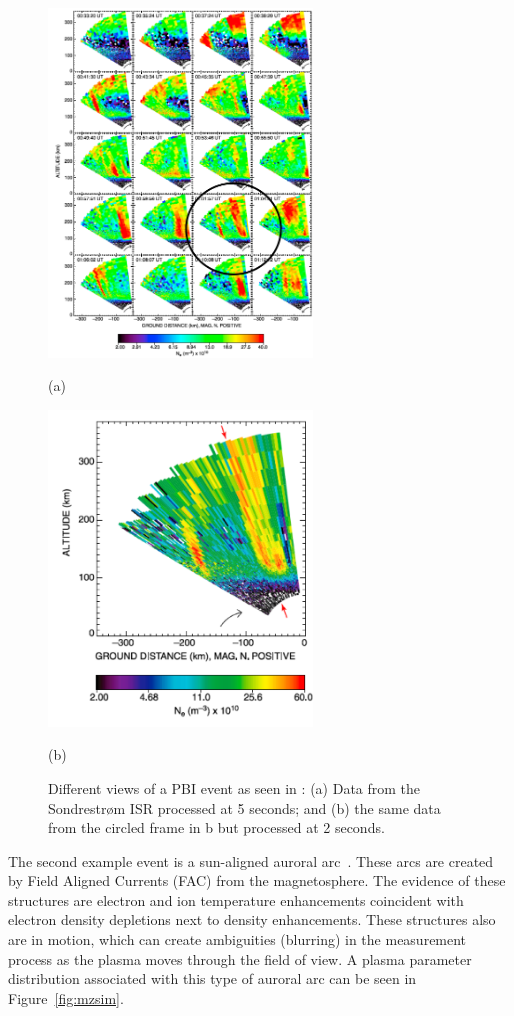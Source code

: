 \begin{figure}[htb]
  \begin{minipage}[t]{0.49\linewidth}\centering
    \includegraphics[width=7cm]{pbiall}
    \medskip
    \centerline{(a)}
  \end{minipage}\hfill
  \begin{minipage}[t]{0.49\linewidth}\centering
    \includegraphics[width=7cm]{pbifast}
    \medskip
    \centerline{(b)}
  \end{minipage}
  \caption{Different views of a PBI event as seen in \cite{Semeter:2005fo}: (a) Data from the Sondrestrøm ISR processed at 5 seconds; and (b) the same data from the circled frame in b but processed at 2 seconds. }
  \label{fig:Sampling}
\end{figure}

The second example event is a sun-aligned auroral arc~\cite{Perry:2015jf}. These arcs are created by Field Aligned Currents (FAC) from the magnetosphere. The evidence of these structures are electron and ion temperature enhancements coincident with electron density depletions next to density enhancements. These structures also are in motion, which can create ambiguities (blurring) in the measurement process as the plasma moves through the field of view. A plasma parameter distribution associated with this type of auroral arc can be seen in Figure~\ref{fig:mzsim}.

